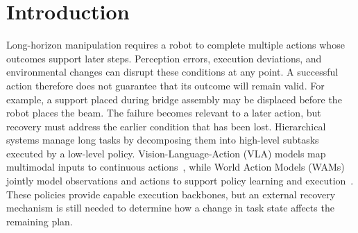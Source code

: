 \documentclass[letterpaper,10pt,conference]{ieeeconf}
\newcommand{\method}{LOGIV\xspace}
\begin{document}
\begin{abstract}
\end{abstract}

\section{Introduction}
Long-horizon manipulation requires a robot to complete multiple actions whose outcomes support later steps. Perception errors, execution deviations, and environmental changes can disrupt these conditions at any point. A successful action therefore does not guarantee that its outcome will remain valid. For example, a support placed during bridge assembly may be displaced before the robot places the beam. The failure becomes relevant to a later action, but recovery must address the earlier condition that has been lost. Hierarchical systems manage long tasks by decomposing them into high-level subtasks executed by a low-level policy. Vision-Language-Action (VLA) models map multimodal inputs to continuous actions~\cite{team2024octo,kim2024openvla,intelligence2025pi_}, while World Action Models (WAMs) jointly model observations and actions to support policy learning and execution~\cite{yuan2026fast,cai2026aha}. These policies provide capable execution backbones, but an external recovery mechanism is still needed to determine how a change in task state affects the remaining plan.
\end{document}
